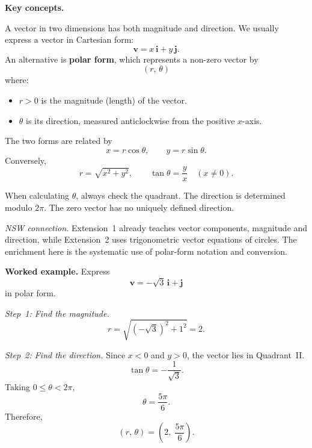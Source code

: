 \begingroup
\small

\noindent{}

\vspace{0.8em}

\noindent\textbf{Key concepts.}

A vector in two dimensions has both magnitude and direction.
We usually express a vector in Cartesian form:
\[
  \mathbf{v} = x\,\mathbf{i} + y\,\mathbf{j}.
\]
An alternative is \textbf{polar form}, which represents a non-zero
vector by
\[
  \boxed{(r,\,\theta)}
\]
where:
\begin{itemize}[leftmargin=*,itemsep=2pt]
  \item $r > 0$ is the magnitude (length) of the vector.
  \item $\theta$ is its direction, measured anticlockwise from the
        positive $x$-axis.
\end{itemize}

The two forms are related by
\[
  \boxed{x = r\cos\theta, \qquad y = r\sin\theta}.
\]
Conversely,
\[
  r = \sqrt{x^2 + y^2},
  \qquad
  \tan\theta = \frac{y}{x} \quad (x \ne 0).
\]

When calculating $\theta$, always check the quadrant.
The direction is determined modulo $2\pi$.
The zero vector has no uniquely defined direction.

\vspace{0.4em}
\noindent\textit{NSW connection.}
Extension~1 already teaches vector components, magnitude and direction,
while Extension~2 uses trigonometric vector equations of circles.
The enrichment here is the systematic use of polar-form notation
and conversion.

\vspace{0.8em}
\noindent\textbf{Worked example.}
Express
\[
  \mathbf{v} = -\sqrt{3}\,\mathbf{i} + \mathbf{j}
\]
in polar form.

\vspace{0.3em}
\noindent\textit{Step~1: Find the magnitude.}
\[
  r = \sqrt{(-\sqrt{3})^{2} + 1^{2}} = 2.
\]

\noindent\textit{Step~2: Find the direction.}
Since $x < 0$ and $y > 0$, the vector lies in Quadrant~II.
\[
  \tan\theta = -\frac{1}{\sqrt{3}}.
\]
Taking $0 \le \theta < 2\pi$,
\[
  \theta = \frac{5\pi}{6}.
\]
Therefore,
\[
  \boxed{(r,\,\theta) = \left(2,\;\frac{5\pi}{6}\right)}.
\]

